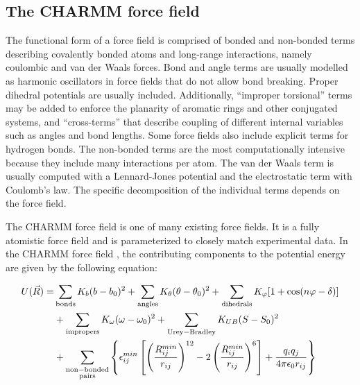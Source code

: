 \subsection{The CHARMM force field}

The functional form of a force field is comprised of bonded and non-bonded terms describing covalently bonded atoms and long-range interactions, namely coulombic and van der Waals forces. Bond and angle terms are usually modelled as harmonic oscillators in force fields that do not allow bond breaking. Proper dihedral potentials are usually included. Additionally, ``improper torsional'' terms may be added to enforce the planarity of aromatic rings and other conjugated systems, and ``cross-terms'' that describe coupling of different internal variables such as angles and bond lengths. Some force fields also include explicit terms for hydrogen bonds. The non-bonded terms are the most computationally intensive because they include many interactions per atom. The van der Waals term is usually computed with a Lennard-Jones potential and the electrostatic term with Coulomb's law. The specific decomposition of the individual terms depends on the force field.

The CHARMM force field is one of many existing force fields. It is a fully atomistic force field and is parameterized to closely match experimental data. In the CHARMM force field \cite{Brooks:2009p6618}, the contributing components to the potential energy are given by the following equation:

\begin{align}
\label{eqn:charmm}
U(\vec{R}) = &\mathop{\sum}_{\rm bonds}K_b (b - b_{0})^2
                     + \mathop{\sum}_{\rm angles} K_\theta (\theta - \theta_{0})^2
                     + \mathop{\sum}_{\rm dihedrals} K_\varphi [1 + {\rm cos}(n\varphi - \delta)] \notag \\
                     & + \mathop{\sum}_{\rm impropers} K_\omega (\omega - \omega_{0})^2
                     + \mathop{\sum}_{\rm Urey-Bradley} K_{UB} (S - S_{0})^2 \notag \\
                     &+ \mathop{\sum}_{\substack{\rm non-bonded \\ \rm pairs}} \left\{\epsilon^{min}_{ij} \left[\left(\frac{R^{min}_{ij}}{r_{ij}}\right)^{12} - 2\left(\frac{R^{min}_{ij}}{r_{ij}}\right)^{6}\right] + \frac{q_{i}q_{j}}{4\pi\epsilon_0 r_{ij}}\right\}
\end{align}

